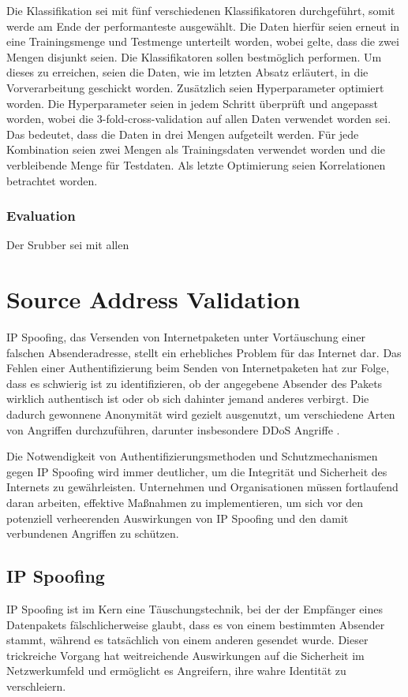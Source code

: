 \documentclass[sigplan,screen]{acmart}
\begin{document}
Die Klassifikation sei mit fünf verschiedenen Klassifikatoren durchgeführt, somit werde am Ende der performanteste ausgewählt. Die Daten hierfür seien erneut in eine Trainingsmenge und Testmenge unterteilt worden, wobei gelte, dass die zwei Mengen disjunkt seien. Die Klassifikatoren sollen bestmöglich performen. Um dieses zu erreichen, seien die Daten, wie im letzten Absatz erläutert, in die Vorverarbeitung geschickt worden. Zusätzlich seien Hyperparameter optimiert worden. Die Hyperparameter seien in jedem Schritt überprüft und angepasst worden, wobei die 3-fold-cross-validation auf allen Daten verwendet worden sei. Das bedeutet, dass die Daten in drei Mengen aufgeteilt werden. Für jede Kombination seien zwei Mengen als Trainingsdaten verwendet worden und die verbleibende Menge für Testdaten. Als letzte Optimierung seien Korrelationen betrachtet worden.

\subsubsection{Evaluation}

Der Srubber sei mit allen 

\cite{Hohlfeld01}

\section{Source Address Validation}
IP Spoofing, das Versenden von Internetpaketen unter Vortäuschung einer falschen Absenderadresse, stellt ein erhebliches Problem für das Internet dar. Das Fehlen einer Authentifizierung beim Senden von Internetpaketen hat zur Folge, dass es schwierig ist zu identifizieren, ob der angegebene Absender des Pakets wirklich authentisch ist oder ob sich dahinter jemand anderes verbirgt. Die dadurch gewonnene Anonymität wird gezielt ausgenutzt, um verschiedene Arten von Angriffen durchzuführen, darunter insbesondere DDoS Angriffe \cite{Kor01, Gorilla01}. 

Die Notwendigkeit von Authentifizierungsmethoden und Schutzmechanismen gegen IP Spoofing wird immer deutlicher, um die Integrität und Sicherheit des Internets zu gewährleisten. Unternehmen und Organisationen müssen fortlaufend daran arbeiten, effektive Maßnahmen zu implementieren, um sich vor den potenziell verheerenden Auswirkungen von IP Spoofing und den damit verbundenen Angriffen zu schützen.

\subsection{IP Spoofing}
IP Spoofing ist im Kern eine Täuschungstechnik, bei der der Empfänger eines Datenpakets fälschlicherweise glaubt, dass es von einem bestimmten Absender stammt, während es tatsächlich von einem anderen gesendet wurde. Dieser trickreiche Vorgang hat weitreichende Auswirkungen auf die Sicherheit im Netzwerkumfeld und ermöglicht es Angreifern, ihre wahre Identität zu verschleiern.
\end{document}
